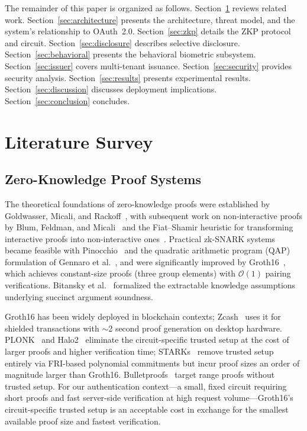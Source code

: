 \documentclass[journal,twoside,10pt]{IEEEtran}
\begin{document}
The remainder of this paper is organized as follows.
Section~\ref{sec:related} reviews related work.
Section~\ref{sec:architecture} presents the architecture, threat model, and
the system's relationship to OAuth~2.0.
Section~\ref{sec:zkp} details the ZKP protocol and circuit.
Section~\ref{sec:disclosure} describes selective disclosure.
Section~\ref{sec:behavioral} presents the behavioral biometric subsystem.
Section~\ref{sec:issuer} covers multi-tenant issuance.
Section~\ref{sec:security} provides security analysis.
Section~\ref{sec:results} presents experimental results.
Section~\ref{sec:discussion} discusses deployment implications.
Section~\ref{sec:conclusion} concludes.

\section{Literature Survey}
\label{sec:related}

\subsection{Zero-Knowledge Proof Systems}

The theoretical foundations of zero-knowledge proofs were established by
Goldwasser, Micali, and Rackoff~\cite{gmr89}, with subsequent work on
non-interactive proofs by Blum, Feldman, and Micali~\cite{bfm88} and the
Fiat--Shamir heuristic for transforming interactive proofs into
non-interactive ones~\cite{fiatshamir}. Practical zk-SNARK systems became
feasible with Pinocchio~\cite{parno13} and the quadratic arithmetic program
(QAP) formulation of Gennaro et al.~\cite{gennaro13}, and were significantly
improved by Groth16~\cite{groth16}, which achieves constant-size proofs
(three group elements) with $\mathcal{O}(1)$ pairing verifications. Bitansky et al.~\cite{bitansky12} formalized the extractable
knowledge assumptions underlying succinct argument soundness.

Groth16 has been widely deployed in blockchain contexts; Zcash~\cite{zcash14}
uses it for shielded transactions with $\sim$2 second proof generation on
desktop hardware. PLONK~\cite{plonk}
and Halo2~\cite{halo2} eliminate the circuit-specific trusted setup at the
cost of larger proofs and higher verification time; STARKs~\cite{starks}
remove trusted setup entirely via FRI-based polynomial commitments but incur
proof sizes an order of magnitude larger than Groth16. Bulletproofs~\cite{bulletproofs}
target range proofs without trusted setup. For our authentication context---a
small, fixed circuit requiring short proofs and fast server-side
verification at high request volume---Groth16's circuit-specific trusted
setup is an acceptable cost in exchange for the smallest available proof
size and fastest verification.
\end{document}
